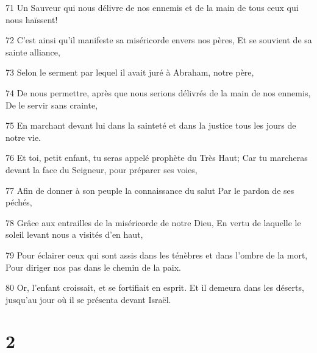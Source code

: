 \par 71 Un Sauveur qui nous délivre de nos ennemis et de la main de tous ceux qui nous haïssent!
\par 72 C'est ainsi qu'il manifeste sa miséricorde envers nos pères, Et se souvient de sa sainte alliance,
\par 73 Selon le serment par lequel il avait juré à Abraham, notre père,
\par 74 De nous permettre, après que nous serions délivrés de la main de nos ennemis, De le servir sans crainte,
\par 75 En marchant devant lui dans la sainteté et dans la justice tous les jours de notre vie.
\par 76 Et toi, petit enfant, tu seras appelé prophète du Très Haut; Car tu marcheras devant la face du Seigneur, pour préparer ses voies,
\par 77 Afin de donner à son peuple la connaissance du salut Par le pardon de ses péchés,
\par 78 Grâce aux entrailles de la miséricorde de notre Dieu, En vertu de laquelle le soleil levant nous a visités d'en haut,
\par 79 Pour éclairer ceux qui sont assis dans les ténèbres et dans l'ombre de la mort, Pour diriger nos pas dans le chemin de la paix.
\par 80 Or, l'enfant croissait, et se fortifiait en esprit. Et il demeura dans les déserts, jusqu'au jour où il se présenta devant Israël.

\chapter{2}

